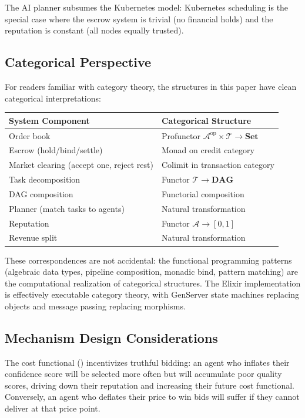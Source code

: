 \documentclass[12pt,a4paper]{article}
\theoremstyle{plain}
\theoremstyle{definition}
\begin{document}
The AI planner subsumes the Kubernetes model: Kubernetes scheduling is the special case where the escrow system is trivial (no financial holds) and the reputation is constant (all nodes equally trusted).

\subsection{Categorical Perspective}

For readers familiar with category theory, the structures in this paper have clean categorical interpretations:

\begin{center}
\begin{tabular}{ll}
\toprule
\textbf{System Component} & \textbf{Categorical Structure} \\
\midrule
Order book & Profunctor $\mathcal{A}^{\text{op}} \times \mathcal{T} \to \mathbf{Set}$ \\
Escrow (hold/bind/settle) & Monad on credit category \\
Market clearing (accept one, reject rest) & Colimit in transaction category \\
Task decomposition & Functor $\mathcal{T} \to \mathbf{DAG}$ \\
DAG composition & Functorial composition \\
Planner (match tasks to agents) & Natural transformation \\
Reputation & Functor $\mathcal{A} \to [0,1]$ \\
Revenue split & Natural transformation \\
\bottomrule
\end{tabular}
\end{center}

These correspondences are not accidental: the functional programming patterns (algebraic data types, pipeline composition, monadic bind, pattern matching) are the computational realization of categorical structures. The Elixir implementation is effectively executable category theory, with GenServer state machines replacing objects and message passing replacing morphisms.

\subsection{Mechanism Design Considerations}

The cost functional () incentivizes truthful bidding: an agent who inflates their confidence score will be selected more often but will accumulate poor quality scores, driving down their reputation and increasing their future cost functional. Conversely, an agent who deflates their price to win bids will suffer if they cannot deliver at that price point.
\end{document}
